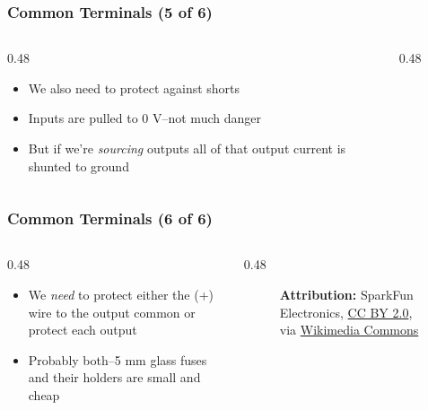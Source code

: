\begin{frame}
    \frametitle{Common Terminals (5 of 6)}

    \begin{columns}
        \begin{column}{0.48\linewidth}
            \begin{itemize}
                \item We also need to protect against shorts
                \item Inputs are pulled to 0 V--not much danger
                \item But if we're \emph{sourcing} outputs all of that output current is shunted to ground
            \end{itemize}
        \end{column}
        \begin{column}{0.48\linewidth}
            \begin{figure}
                \centering
                \resizebox{0.875\columnwidth}{!}{
                    
                }
            \end{figure}
        \end{column}
    \end{columns}
\end{frame}

\begin{frame}
    \frametitle{Common Terminals (6 of 6)}

    \begin{columns}
        \begin{column}{0.48\linewidth}
            \begin{itemize}
                \item We \emph{need} to protect either the (+) wire to the output common or protect each output
                \item Probably both--5 mm glass fuses and their holders are small and cheap
            \end{itemize}
        \end{column}
        \begin{column}{0.48\linewidth}
            \begin{figure}
                \centering

                {\tiny \textbf{Attribution:} SparkFun Electronics, \href{https://creativecommons.org/licenses/by/2.0}{CC BY 2.0}, via \href{https://commons.wikimedia.org/wiki/File:SparkFun_fuse-5mm-250v-500ma_16096159897_o.jpg}{Wikimedia Commons}\par}
            \end{figure}
        \end{column}
    \end{columns}
\end{frame}

